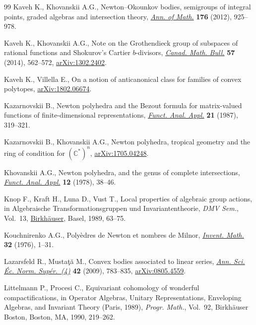 \documentclass[pdftex]{sigma}
\numberwithin{equation}{section}
\theoremstyle{definition}
\begin{document}
\begin{thebibliography}{99}
Kaveh K., Khovanskii A.G., Newton--{O}kounkov bodies, semigroups of integral
 points, graded algebras and intersection theory, \href{https://doi.org/10.4007/annals.2012.176.2.5}{\textit{Ann. of Math.}}
 \textbf{176} (2012), 925--978.

Kaveh K., Khovanskii A.G., Note on the {G}rothendieck group of subspaces of
 rational functions and {S}hokurov's {C}artier {$b$}-divisors, \href{https://doi.org/10.4153/CMB-2013-039-6}{\textit{Canad.
 Math. Bull.}} \textbf{57} (2014), 562--572, \href{https://arxiv.org/abs/1302.2402}{arXiv:1302.2402}.

Kaveh K., Villella E., On a notion of anticanonical class for families of
 convex polytopes, \href{https://arxiv.org/abs/1802.06674}{arXiv:1802.06674}.

Kazarnovskii B., Newton polyhedra and the {B}ezout formula for matrix-valued
 functions of finite-dimensional representations, \href{https://doi.org/10.1007/BF01077809}{\textit{Funct. Anal. Appl.}} \textbf{21} (1987), 319--321.

Kazarnovskii B., Khovanskii A.G., Newton polyhedra, tropical geometry and the
 ring of condition for $({\mathbb C}^*)^n$, \href{https://arxiv.org/abs/1705.04248}{arXiv:1705.04248}.

Khovanskii A.G., Newton polyhedra, and the genus of complete intersections,
 \href{https://doi.org/10.1007/BF01077562}{\textit{Funct. Anal. Appl.}} \textbf{12} (1978), 38--46.

Knop F., Kraft H., Luna D., Vust T., Local properties of algebraic group
 actions, in Algebraische {T}ransformationsgruppen und {I}nvariantentheorie,
 \textit{DMV Sem.}, Vol.~13, \href{https://doi.org/10.1007/978-3-0348-7662-9_4}{Birkh\"{a}user}, Basel, 1989, 63--75.

Kouchnirenko A.G., Poly\`edres de {N}ewton et nombres de {M}ilnor,
 \href{https://doi.org/10.1007/BF01389769}{\textit{Invent. Math.}} \textbf{32} (1976), 1--31.

Lazarsfeld R., Musta\c{t}\u{a} M., Convex bodies associated to linear series,
 \href{https://doi.org/10.24033/asens.2109}{\textit{Ann. Sci. \'Ec. Norm. Sup\'er.~(4)}} \textbf{42} (2009), 783--835, \href{https://arxiv.org/abs/0805.4559}{arXiv:0805.4559}.

Littelmann P., Procesi C., Equivariant cohomology of wonderful
 compactifications, in Operator Algebras, Unitary Representations, Enveloping
 Algebras, and Invariant Theory ({P}aris, 1989), \textit{Progr. Math.},
 Vol.~92, Birkh\"{a}user Boston, Boston, MA, 1990, 219--262.


\end{thebibliography}
\end{document}
